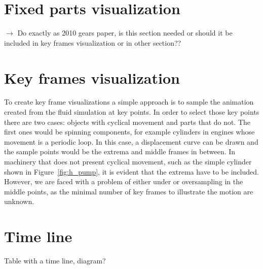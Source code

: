\section{Fixed parts visualization}

$\rightarrow$ Do exactly as 2010 gears paper, is this section needed or should it be included in key frames visualization or in other section??


\section{Key frames visualization}

To create key frame visualizations a simple approach is to sample the animation created from the fluid simulation at key points.
In order to select those key points there are two cases: objects with cyclical movement and parts that do not.
The first ones would be spinning components, for example cylinders in engines whose movement is a periodic loop.
In this case, a displacement curve can be drawn and the sample points would be the extrema and middle frames in between.
In machinery that does not present cyclical movement, such as the simple cylinder shown in Figure~\ref{fig:h_pump}, it is evident that the extrema have to be included.
However, we are faced with a problem of either under or oversampling in the middle points, as the minimal number of key frames to illustrate the motion are unknown. 

\section{Time line}

Table with a time line, diagram?